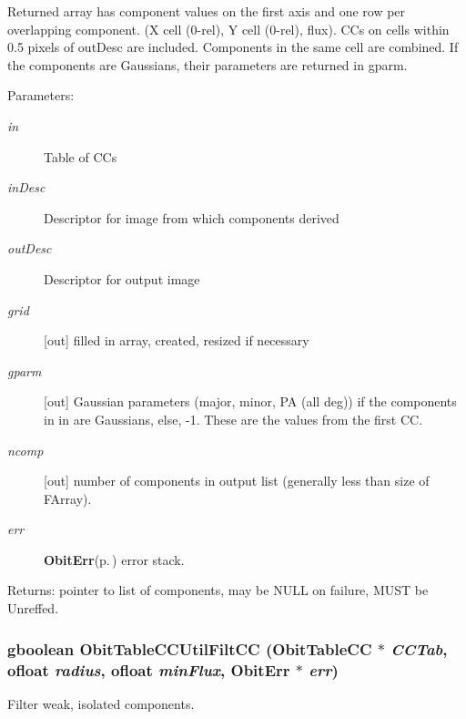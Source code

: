 Returned array has component values on the first axis and one row per overlapping component. (X cell (0-rel), Y cell (0-rel), flux). CCs on cells within 0.5 pixels of out\-Desc are included. Components in the same cell are combined. If the components are Gaussians, their parameters are returned in gparm. \begin{Desc}
\item[Parameters:]
\begin{description}
\item[{\em in}]Table of CCs \item[{\em in\-Desc}]Descriptor for image from which components derived \item[{\em out\-Desc}]Descriptor for output image \item[{\em grid}][out] filled in array, created, resized if necessary \item[{\em gparm}][out] Gaussian parameters (major, minor, PA (all deg)) if the components in in are Gaussians, else, -1. These are the values from the first CC. \item[{\em ncomp}][out] number of components in output list (generally less than size of FArray). \item[{\em err}]{\bf Obit\-Err}{\rm (p.\,\pageref{structObitErr})} error stack. \end{description}
\end{Desc}
\begin{Desc}
\item[Returns:]pointer to list of components, may be NULL on failure, MUST be Unreffed. \end{Desc}
\subsubsection{\setlength{\rightskip}{0pt plus 5cm}gboolean Obit\-Table\-CCUtil\-Filt\-CC ({\bf Obit\-Table\-CC} $\ast$ {\em CCTab}, {\bf ofloat} {\em radius}, {\bf ofloat} {\em min\-Flux}, {\bf Obit\-Err} $\ast$ {\em err})}\label{ObitTableCCUtil_8c_a13}


Filter weak, isolated components. 

